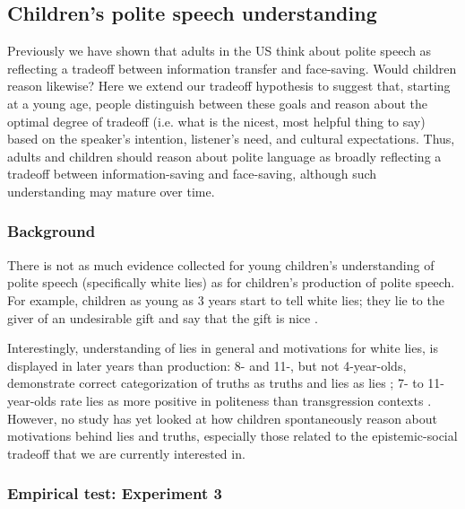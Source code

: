 \subsection{Children's polite speech understanding}
\label{sec:child}

Previously we have shown that adults in the US think about polite speech as reflecting a tradeoff between information transfer and face-saving. Would children reason likewise? Here we extend our tradeoff hypothesis to suggest that, starting at a young age, people distinguish between these goals and reason about the optimal degree of tradeoff (i.e. what is the nicest, most helpful thing to say) based on the speaker's intention, listener's need, and cultural expectations. Thus, adults and children should reason about polite language as broadly reflecting a tradeoff between information-saving and face-saving, although such understanding may mature over time. 

\subsubsection{Background}

There is not as much evidence collected for young children's understanding of polite speech (specifically white lies) as for children's production of polite speech. For example, children as young as 3 years start to tell white lies; they lie to the giver of an undesirable gift and say that the gift is nice \citep{talwar2007}. 

Interestingly, understanding of lies in general and motivations for white lies, is displayed in later years than production: 8- and 11-, but not 4-year-olds, demonstrate correct categorization of truths as truths and lies as lies \citep{bussey1999}; 7- to 11-year-olds rate lies as more positive in politeness than transgression contexts \citep{heyman2009}. However, no study has yet looked at how children spontaneously reason about motivations behind lies and truths, especially those related to the epistemic-social tradeoff that we are currently interested in. 

\subsubsection{Empirical test: Experiment 3}


